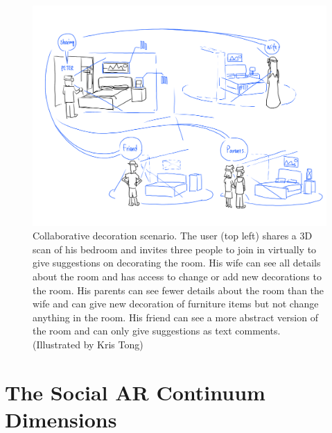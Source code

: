 \begin{figure}[ht]
    \centering
    \includegraphics[width=\linewidth]{images/30-continuum/illustrations/1_Remote_Bed.png}
    \caption{Collaborative decoration scenario. The user (top left) shares a 3D scan of his bedroom and invites three people to join in virtually to give suggestions on decorating the room. His wife can see all details about the room and has access to change or add new decorations to the room. His parents can see fewer details about the room than the wife and can give new decoration of furniture items but not change anything in the room. His friend can see a more abstract version of the room and can only give suggestions as text comments.  (Illustrated by Kris Tong)}
    \label{fig:illustration:remote-bed}
\end{figure}

\pagebreak
\section{The Social AR Continuum Dimensions}

